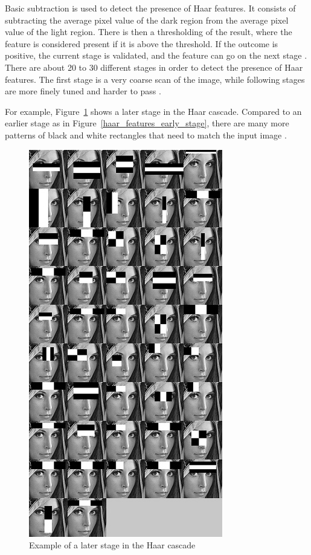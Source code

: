 \noindent Basic subtraction is used to detect the presence of Haar features. It consists of subtracting the average pixel value of the dark region from the average pixel value of the light region. There is then a thresholding of the result, where the feature is considered present if it is above the threshold. If the outcome is positive, the current stage is validated, and the feature can go on the next stage \cite{HEW07}. There are about 20 to 30 different stages in order to detect the presence of Haar features. The first stage is a very coarse scan of the image, while following stages are more finely tuned and harder to pass \cite{HAR12}.
\newline

\noindent For example, Figure~\ref{haar_feature_later_stage} shows a later stage in the Haar cascade. Compared to an earlier stage as in Figure~\ref{haar_features_early_stage}, there are many more patterns of black and white rectangles that need to match the input image \cite{HAR12}.
\newline

\begin{figure}[!h]
\begin{center}
\noindent \includegraphics[scale=0.8]{figures/haar_feature_later_stage} 
\newline
\caption{Example of a later stage in the Haar cascade \cite{HAR12}}
\label{haar_feature_later_stage}
\end{center} 
\end{figure}

